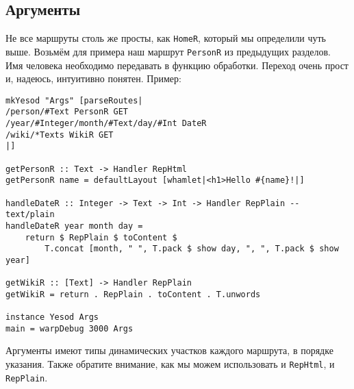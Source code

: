 \subsection{Аргументы}
Не все маршруты столь же просты, как \lstinline!HomeR!, который мы
определили чуть выше. Возьмём для примера наш маршрут
\lstinline!PersonR! из предыдущих разделов. Имя человека необходимо
передавать в функцию обработки. Переход очень прост и, надеюсь,
интуитивно понятен. Пример:
\begin{lstlisting}
mkYesod "Args" [parseRoutes|
/person/#Text PersonR GET
/year/#Integer/month/#Text/day/#Int DateR
/wiki/*Texts WikiR GET
|]

getPersonR :: Text -> Handler RepHtml
getPersonR name = defaultLayout [whamlet|<h1>Hello #{name}!|]

handleDateR :: Integer -> Text -> Int -> Handler RepPlain -- text/plain
handleDateR year month day =
    return $ RepPlain $ toContent $
        T.concat [month, " ", T.pack $ show day, ", ", T.pack $ show year]

getWikiR :: [Text] -> Handler RepPlain
getWikiR = return . RepPlain . toContent . T.unwords

instance Yesod Args
main = warpDebug 3000 Args
\end{lstlisting}%

Аргументы имеют типы динамических участков каждого маршрута, в порядке
указания. Также обратите внимание, как мы можем использовать и
\lstinline!RepHtml!, и \lstinline!RepPlain!.

